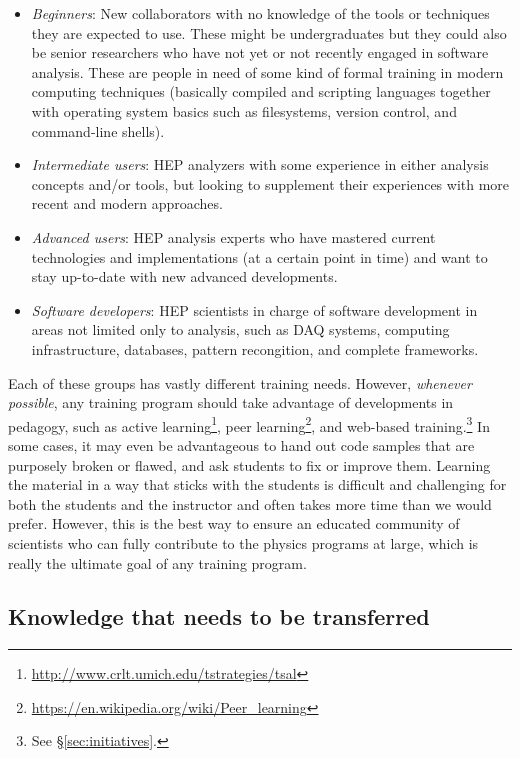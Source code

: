 \documentclass[12pt,a4paper]{article}
\begin{document}
\begin{itemize}
   \item \emph{Beginners}: New collaborators with no knowledge of the 
   tools or techniques they are expected to use. These might be undergraduates 
   but they could also be senior researchers who have not yet or not recently 
   engaged in software analysis. These are people in need of some kind of formal 
   training in modern computing techniques (basically compiled and scripting 
   languages together with operating system basics such as filesystems, version 
   control, and command-line shells).
   \item \emph{Intermediate users}: HEP analyzers with some experience in 
   either analysis concepts and/or tools, but  looking to supplement their 
   experiences with more recent and modern approaches. 
   \item \emph{Advanced users}: HEP analysis experts who have mastered current 
   technologies and implementations (at a certain point in time) and want to 
   stay up-to-date with new advanced developments.
   \item \emph{Software developers}: HEP scientists in charge of software 
   development in areas not limited only to analysis, such as DAQ systems, 
   computing infrastructure, databases, pattern recongition, and complete 
   frameworks.
\end{itemize}

Each of these groups has vastly different training needs. However,
\emph{whenever possible}, any training program should take advantage of
developments in pedagogy, such as active
learning\footnote{\url{http://www.crlt.umich.edu/tstrategies/tsal}}, peer
learning\footnote{\url{https://en.wikipedia.org/wiki/Peer_learning}}, and
web-based training.\footnote{See \S\ref{sec:initiatives}.} In some cases, it may
even be advantageous to hand out code samples that are purposely broken or
flawed, and ask students to fix or improve them. Learning the material in a way
that sticks with the students is difficult and challenging for both the students
and the instructor and often takes more time than we would prefer. However, this
is the best way to ensure an educated community of scientists who can fully
contribute to the physics programs at large, which is really the ultimate goal
of any training program.

\subsection{Knowledge that needs to be transferred}
\end{document}
